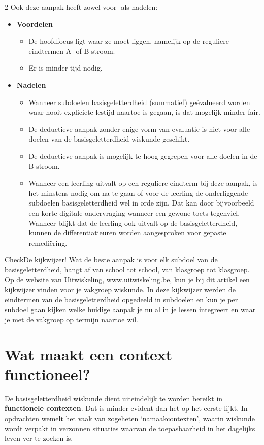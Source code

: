\begin{multicols}{2}
Ook deze aanpak heeft zowel voor- als nadelen:
\begin{itemize}
    \item \textbf{Voordelen}
    \begin{itemize}
        \item De hoofdfocus ligt waar ze moet liggen, namelijk op de reguliere eindtermen A- of B-stroom.
        \item Er is minder tijd nodig.
    \end{itemize}
    \item \textbf{Nadelen}
    \begin{itemize}
        \item Wanneer subdoelen basisgeletterdheid (summatief) geëvalueerd worden waar nooit expliciete lestijd naartoe is gegaan, is dat mogelijk minder fair.
        \item De deductieve aanpak zonder enige vorm van evaluatie is niet voor alle doelen van de basisgeletterdheid wiskunde geschikt.
        \item De deductieve aanpak is mogelijk te hoog gegrepen voor alle doelen in de B-stroom.
        \item Wanneer een leerling uitvalt op een reguliere eindterm bij deze aanpak, is het minstens nodig om na te gaan of voor de leerling de onderliggende subdoelen basisgeletterdheid wel in orde zijn. Dat kan door bijvoorbeeld een korte digitale ondervraging wanneer een gewone toets tegenviel. Wanneer blijkt dat de leerling ook uitvalt op de basisgeletterdheid, kunnen de differentiatieuren worden aangesproken voor gepaste remediëring.
    \end{itemize}
\end{itemize}

\begin{kader}{Check}{De kijkwijzer!}
Wat de beste aanpak is voor elk subdoel van de basisgeletterdheid, hangt af van school tot school, van klasgroep tot klasgroep. Op de website van Uitwiskeling, \url{www.uitwiskeling.be}, kun je bij dit artikel een kijkwijzer vinden voor je vakgroep wiskunde. In deze kijkwijzer werden de eindtermen van de basisgeletterdheid opgedeeld in subdoelen en kun je per subdoel gaan kijken welke huidige aanpak je nu al in je lessen integreert en waar je met de vakgroep op termijn naartoe wil.
\end{kader}

\section{Wat maakt een context functioneel?}
De basisgeletterdheid wiskunde dient uiteindelijk te worden bereikt in \textbf{functionele contexten}. Dat is minder evident dan het op het eerste lijkt. In opdrachten wemelt het vaak van zogeheten `namaakcontexten', waarin wiskunde wordt verpakt in verzonnen situaties waarvan de toepasbaarheid in het dagelijks leven ver te zoeken is. 


\end{multicols}
